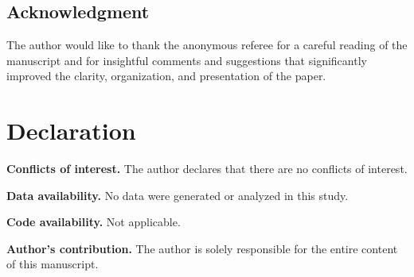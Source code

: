 \documentclass[12pt, reqno]{amsart}
\theoremstyle{plain}
\theoremstyle{definition}
\begin{document}
 
 \subsection*{Acknowledgment} The author would like to thank the anonymous referee for a careful reading of the manuscript and for insightful comments and suggestions that significantly improved the clarity, organization, and presentation of the paper.
 
 
 
\section*{Declaration}

\noindent\textbf{Conflicts of interest.} The author declares that there are no conflicts of interest.

\vspace{0.2cm}

\noindent\textbf{Data availability.} No data were generated or analyzed in this study.

\vspace{0.2cm}

\noindent\textbf{Code availability.} Not applicable.

\vspace{0.2cm}

\noindent\textbf{Author's contribution.} The author is solely responsible for the entire content of this manuscript.
 
 

\end{document}
